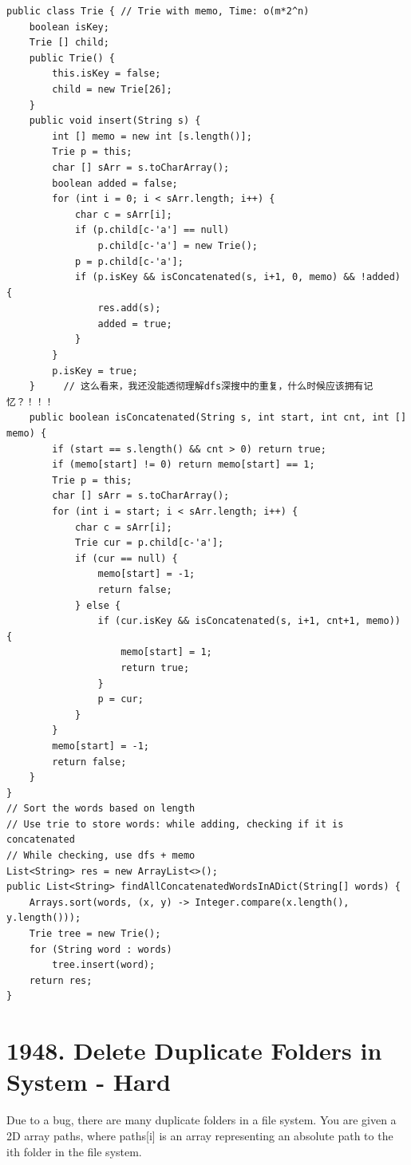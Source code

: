 \documentclass[9pt, b5paaper]{book}
\begin{document}
\begin{verbatim}
public class Trie { // Trie with memo, Time: o(m*2^n)
    boolean isKey;
    Trie [] child;
    public Trie() {
        this.isKey = false;
        child = new Trie[26];
    }
    public void insert(String s) {
        int [] memo = new int [s.length()];
        Trie p = this;
        char [] sArr = s.toCharArray();
        boolean added = false;
        for (int i = 0; i < sArr.length; i++) {
            char c = sArr[i];
            if (p.child[c-'a'] == null)
                p.child[c-'a'] = new Trie();
            p = p.child[c-'a'];
            if (p.isKey && isConcatenated(s, i+1, 0, memo) && !added) {
                res.add(s);
                added = true;
            }
        }
        p.isKey = true;
    }     // 这么看来，我还没能透彻理解dfs深搜中的重复，什么时候应该拥有记忆？！！！
    public boolean isConcatenated(String s, int start, int cnt, int [] memo) {
        if (start == s.length() && cnt > 0) return true; 
        if (memo[start] != 0) return memo[start] == 1;
        Trie p = this;
        char [] sArr = s.toCharArray();
        for (int i = start; i < sArr.length; i++) {
            char c = sArr[i];
            Trie cur = p.child[c-'a'];
            if (cur == null) {
                memo[start] = -1;
                return false;
            } else {
                if (cur.isKey && isConcatenated(s, i+1, cnt+1, memo)) {
                    memo[start] = 1;
                    return true;
                }
                p = cur;
            }
        }
        memo[start] = -1;
        return false;
    }
}
// Sort the words based on length
// Use trie to store words: while adding, checking if it is concatenated
// While checking, use dfs + memo
List<String> res = new ArrayList<>();
public List<String> findAllConcatenatedWordsInADict(String[] words) {
    Arrays.sort(words, (x, y) -> Integer.compare(x.length(), y.length()));
    Trie tree = new Trie();
    for (String word : words) 
        tree.insert(word);
    return res;
}
\end{verbatim}

\section{1948. Delete Duplicate Folders in System - Hard}
\label{sec-9-9}
Due to a bug, there are many duplicate folders in a file system. You are given a 2D array paths, where paths[i] is an array representing an absolute path to the ith folder in the file system.
\end{document}
